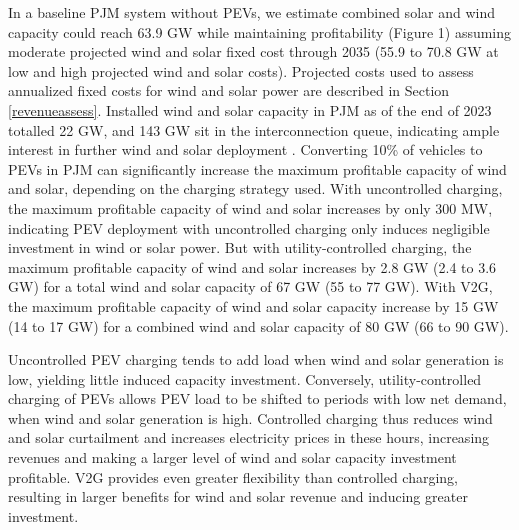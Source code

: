 \documentclass[9pt,twocolumn,twoside,lineno]{pnas-new}
\begin{document}
In a baseline PJM system without PEVs, we estimate combined solar and wind capacity could reach 63.9 GW while maintaining profitability (Figure 1) assuming moderate projected wind and solar fixed cost through 2035 (55.9 to 70.8 GW at low and high projected wind and solar costs). Projected costs used to assess annualized fixed costs for wind and solar power are described in Section \ref{revenueassess}. Installed wind and solar capacity in PJM as of the end of 2023 totalled 22 GW, and 143 GW sit in the interconnection queue, indicating ample interest in further wind and solar deployment \cite{noauthor_pjm_nodate-3}. 
Converting 10\% of vehicles to PEVs in PJM can significantly increase the maximum profitable capacity of wind and solar, depending on the charging strategy used. With uncontrolled charging, the maximum profitable capacity of wind and solar increases by only 300 MW, indicating PEV deployment with uncontrolled charging only induces negligible investment in wind or solar power. But with utility-controlled charging, the maximum profitable capacity of wind and solar increases by 2.8 GW (2.4 to 3.6 GW) for a total wind and solar capacity of 67 GW (55 to 77 GW). With V2G, the maximum profitable capacity of wind and solar capacity increase by 15 GW (14 to 17 GW) for a combined wind and solar capacity of 80 GW (66 to 90 GW). %

Uncontrolled PEV charging tends to add load when wind and solar generation is low, yielding little induced capacity investment. Conversely, utility-controlled charging of PEVs allows PEV load to be shifted to periods with low net demand, when wind and solar generation is high. Controlled charging thus reduces wind and solar curtailment and increases electricity prices in these hours, increasing revenues and making a larger level of wind and solar capacity investment profitable. V2G provides even greater flexibility than controlled charging, resulting in larger benefits for wind and solar revenue and inducing greater investment.
\end{document}
